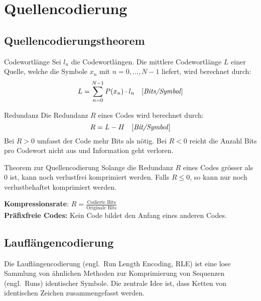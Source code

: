 \section{Quellencodierung}\label{sec:quellencodierung}

\subsection{Quellencodierungstheorem}\label{subsec:quellencodierungstheorem}

\begin{definition}{Codewortl\"ange}
    Sei $l_n$ die Codewortlängen.
    Die mittlere Codewortlänge $L$ einer Quelle, welche die Symbole $x_n$ mit $n = 0,\dots,N-1$ liefert, wird berechnet durch: \[L = \sum_{n=0}^{N-1} P(x_n) \cdot l_n \quad \text{[\emph{Bits/Symbol}]}\]
\end{definition}

\begin{definition}{Redundanz}
    Die Redundanz $R$ eines Codes wird berechnet durch: \[R = L - H \quad \text{[\emph{Bit/Symbol}]}\]
    Bei $R > 0$ umfasst der Code mehr Bits als nötig.
    Bei $R < 0$ reicht die Anzahl Bits pro Codewort nicht aus und Information geht verloren.
\end{definition}

\begin{definition}{Theorem zur Quellencodierung}
    Solange die Redundanz $R$ eines Codes grösser als $0$ ist, kann noch verlustfrei komprimiert werden.
    Falls $R \leq 0$, so kann nur noch verlustbehaftet komprimiert werden.
\end{definition}

\begin{subbox}{}
    \textbf{Kompressionsrate}: $R = \frac{\text{Codierte Bits}}{\text{Originale Bits}}$\\
    \textbf{Präfixfreie Codes:} Kein Code bildet den Anfang eines anderen Codes.
\end{subbox}

\subsection{Lauflängencodierung}\label{subsec:lauflangencodierung}

Die Lauflängencodierung (engl.\ Run Length Encoding, RLE) ist eine lose Sammlung von ähnlichen Methoden zur Komprimierung von Sequenzen (engl.\ Runs) identischer Symbole.
Die zentrale Idee ist, dass Ketten von identischen Zeichen zusammengefasst werden.

